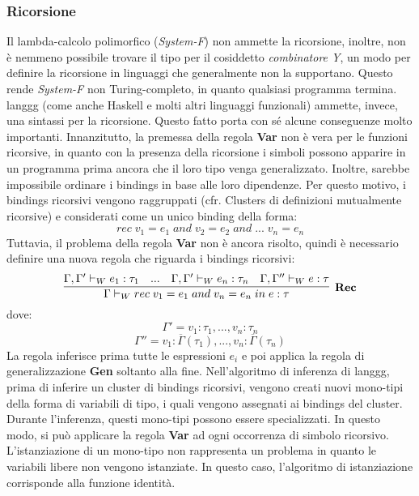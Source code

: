 \documentclass[10pt,a4paper]{article}
\begin{document}
\subsubsection{Ricorsione}
Il lambda-calcolo polimorfico (\textit{System-F}) non ammette la ricorsione, inoltre, non è nemmeno possibile
trovare il tipo per il cosiddetto \textit{combinatore Y}, un modo per definire la ricorsione in linguaggi che
generalmente non la supportano. Questo rende \textit{System-F} non Turing-completo, in quanto qualsiasi programma
termina. langgg (come anche Haskell e molti altri linguaggi funzionali) ammette, invece, una sintassi per la ricorsione.
Questo fatto porta con sé alcune conseguenze molto importanti. Innanzitutto, la premessa della regola \textbf{Var}
non è vera per le funzioni ricorsive, in quanto con la presenza della ricorsione i simboli possono apparire in un
programma prima ancora che il loro tipo venga generalizzato. Inoltre, sarebbe impossibile ordinare i bindings in base
alle loro dipendenze. Per questo motivo, i bindings ricorsivi vengono raggruppati
(cfr. Clusters di definizioni mutualmente ricorsive) e considerati come un unico binding della forma:
\[ rec \; v_1 = e_1 \; and \; v_2 = e_2 \; and \; ... \; v_n = e_n \]
Tuttavia, il problema della regola \textbf{Var} non è ancora risolto, quindi è necessario definire una nuova regola
che riguarda i bindings ricorsivi:
\[ \infer[\textbf{Rec}]{\Gamma \vdash_W rec \; v_1 = e_1 \; and \; v_n = e_n \; in \; e : \tau }{\Gamma, \Gamma' \vdash_W e_1 : \tau_1 & ... & \Gamma, \Gamma' \vdash_W e_n : \tau_n & \Gamma, \Gamma'' \vdash_W e : \tau } \]
dove:
\[ \Gamma' = v_1 : \tau_1, ..., v_n : \tau_n \]
\[ \Gamma'' = v_1 : \overline{\Gamma}(\tau_1), ..., v_n : \overline{\Gamma}(\tau_n) \]
La regola inferisce prima tutte le espressioni $ e_i $ e poi applica la regola di generalizzazione \textbf{Gen} soltanto
alla fine. Nell'algoritmo di inferenza di langgg, prima di inferire un cluster di bindings ricorsivi, vengono creati
nuovi mono-tipi della forma di variabili di tipo, i quali vengono assegnati ai bindings del cluster. Durante l'inferenza,
questi mono-tipi possono essere specializzati. In questo modo, si può applicare la regola
\textbf{Var} ad ogni occorrenza di simbolo ricorsivo. L'istanziazione di un mono-tipo non rappresenta un problema
in quanto le variabili libere non vengono istanziate. In questo caso, l'algoritmo di istanziazione corrisponde
alla funzione identità.
\end{document}
